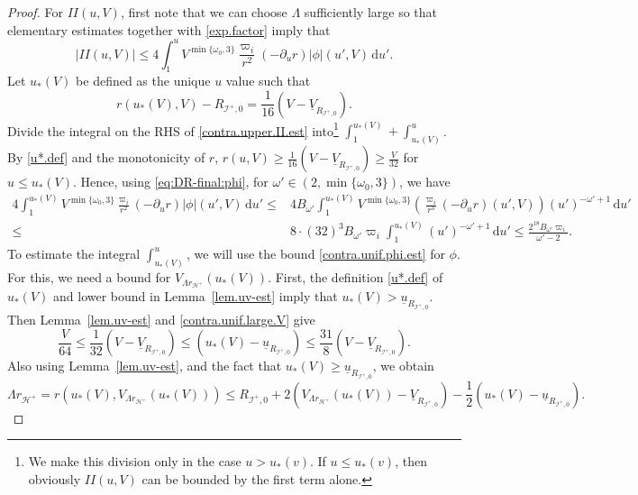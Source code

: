 \documentclass[10pt, reqno]{amsart}
\theoremstyle{definition}
\theoremstyle{remark}
\theoremstyle{conjecture}
\numberwithin{equation}{section}
\newcommand{\ud}{\mathrm{d}}
\newcommand{\rd}{\partial}
\newcommand{\0}{\emptyset}
\newcommand{\omg}{\omega}
\newcommand{\calH}{\mathcal H}
\newcommand{\calI}{\mathcal I}
\newcommand{\f}{\frac}
\newcommand{\EH}{\calH^{+}}
\newcommand{\NI}{\calI^{+}}						%
\newcommand{\ub}{\underline{u}}
\newcommand{\Vb}{\underline{V}}
\begin{document}
\begin{proof}
For $II(u,V)$, first note that we can choose $\Lambda$ sufficiently large so that elementary estimates together with \eqref{exp.factor} imply that 
\begin{equation}\label{contra.upper.II.est}
|II(u,V)|\leq 4 \int_{1}^u V^{\min\{\omg_0,3\}}\frac{\varpi_i}{r^{2}} (-\rd_{u} r)|\phi| (u',V) \, \ud u'.
\end{equation}
Let $u_*(V)$ be defined as the unique $u$ value such that 
\begin{equation}\label{u*.def}
r(u_*(V),V)-R_{\NI,0}=\frac {1}{16} (V - \Vb_{R_{\NI,0}}).
\end{equation}
Divide the integral on the RHS of \eqref{contra.upper.II.est} into\footnote{We make this division only in the case $u> u_*(v)$. If $u\leq u_*(v)$, then obviously $II(u,V)$ can be bounded by the first term alone.} $\int_{1}^{u_*(V)}+\int_{u_*(V)}^u$. By \eqref{u*.def} and the monotonicity of $r$, $r(u,V)\geq \f {1}{16}(V - \Vb_{R_{\NI,0}}) \geq \f V {32}$ for $u\leq u_*(V)$. Hence, using \eqref{eq:DR-final:phi}, for $\omg'\in (2,\min\{\omg_0,3\})$, we have
\begin{equation}\label{contra.upper.II.est.1}
\begin{split}
4 \int_{1}^{u_*(V)} V^{\min\{\omg_0,3\}}\frac{\varpi_i}{r^{2}} (-\rd_{u} r)|\phi| (u',V) \, \ud u' \leq &4 B_{\omg'}\int_{1}^{u_*(V)} V^{\min\{\omg_0,3\}}\left(\frac{\varpi_i}{r^{3}}(-\rd_{u} r)(u',V)\right) (u')^{-\omg'+1} \, \ud u'\\
\leq & 8\cdot (32)^3 B_{\omg'} \varpi_i \int_{1}^{u_*(V)} (u')^{-\omg'+1}\, \ud u' \leq \f{2^{18} B_{\omg'} \varpi_i }{\omg'-2}.
\end{split}
\end{equation}
To estimate the integral $\int_{u_*(V)}^u$, we will use the bound \eqref{contra.unif.phi.est} for $\phi$. For this, we need a bound for $V_{\Lambda r_{\EH}}(u_*(V))$. First, the definition \eqref{u*.def} of $u_*(V)$ and lower bound in Lemma~\ref{lem.uv-est} imply that $u_*(V)>\ub_{R_{\NI,0}}$. Then Lemma~\ref{lem.uv-est} and \eqref{contra.unif.large.V} give
\begin{equation}\label{u*.lower.bd}
\frac{V}{64} \leq \frac{1}{32} (V - \Vb_{R_{\NI,0}}) \leq (u_*(V)-\ub_{R_{\NI,0}}) \leq \f {31}8 (V - \Vb_{R_{\NI,0}}).
\end{equation}
Also using Lemma~\ref{lem.uv-est}, and the fact that $u_*(V)\geq \ub_{R_{\NI,0}}$, we obtain
$$\Lambda r_{\EH}=r(u_*(V),V_{\Lambda r_{\EH}}(u_*(V)))\leq R_{\NI,0}+2 (V_{\Lambda r_{\EH}}(u_*(V)) - \Vb_{R_{\NI,0}})-\f 12(u_*(V)-\ub_{R_{\NI,0}}).$$

\end{proof}
\end{document}
